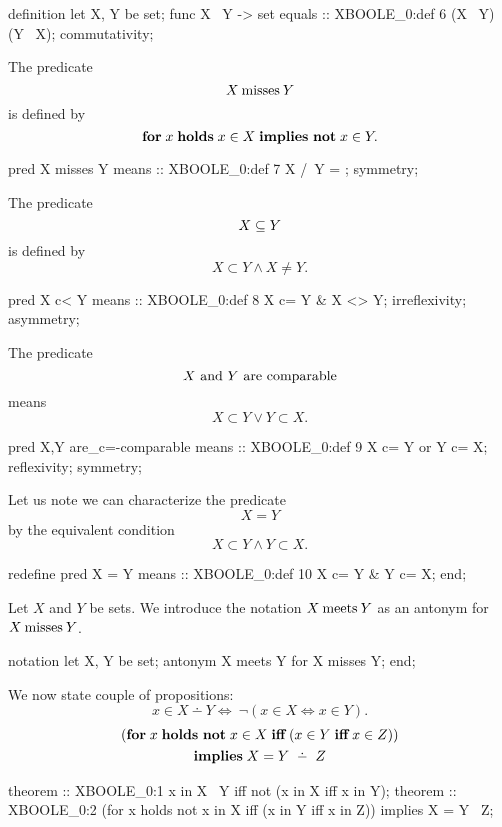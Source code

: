 \begin{paracol}{2}
\switchcolumn
\begin{mizar}
definition
  let X, Y be set;
  func X \+\ Y -> set
  equals :: XBOOLE_0:def 6
  (X \ Y) \/ (Y \ X);
  commutativity;
\end{mizar}

\switchcolumn*\ensurevspace{5cm}
\noindent The predicate
\[ X\mathbin{\text{misses}} Y\]
is defined by
\[\forall x\holds x\in X\implies\ \neg x\in Y.\]
\switchcolumn
\begin{mizar}
  pred X misses Y
  means :: XBOOLE_0:def 7
  X /\ Y = {};
  symmetry;
\end{mizar}

\switchcolumn*\ensurevspace{5cm}
\noindent The predicate
\[ X \propersubset Y \]
is defined by
\[ X\subset Y\land X\neq Y.\]
\switchcolumn
\begin{mizar}
  pred X c< Y
  means :: XBOOLE_0:def 8
  X c= Y & X <> Y;
  irreflexivity;
  asymmetry;
\end{mizar}

\switchcolumn*\ensurevspace{5cm}
\noindent The predicate
\[X\mbox{ and }Y\mbox{ are comparable}\]
means
\[X\subset Y\lor Y\subset X.\]
\switchcolumn
\begin{mizar}
  pred X,Y are_c=-comparable
  means :: XBOOLE_0:def 9
  X c= Y or Y c= X;
  reflexivity;
  symmetry;
\end{mizar}

\switchcolumn*\ensurevspace{5cm}
\noindent Let us note we can characterize the predicate
\[ X = Y \]
by the equivalent condition
\[ X\subset Y\land Y\subset X.\]
\switchcolumn
\begin{mizar}
  redefine pred X = Y
  means :: XBOOLE_0:def 10
  X c= Y & Y c= X;
end;
\end{mizar}

\switchcolumn*\ensurevspace{5cm}
Let $X$ and $Y$ be sets. We introduce the notation $X\mathbin{\text{meets}} Y$ as an
antonym for $X\mathbin{\text{misses}} Y$.
\switchcolumn
\begin{mizar}
notation
  let X, Y be set;
  antonym X meets Y for X misses Y;
end;
\end{mizar}

\switchcolumn*\ensurevspace{5cm}
We now state couple of propositions:
\begin{equation}
x\in X\dotminus Y \iff\ \neg(x\in X\iff x\in Y).
\end{equation}
\begin{multline}
(\forall x\holds\ \neg x\in X\iff (x\in Y\iff x\in Z))\\
\implies X=Y\dotminus Z
\end{multline}
\switchcolumn
\begin{mizar}
theorem :: XBOOLE_0:1
 x in X \+\ Y
 iff not (x in X iff x in Y);
theorem :: XBOOLE_0:2
 (for x holds not x in X
              iff (x in Y iff x in Z))
  implies X = Y \+\ Z;
\end{mizar}


\end{paracol}
